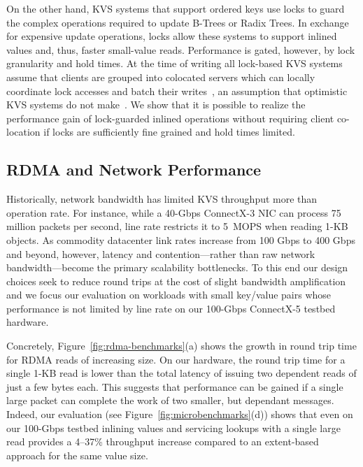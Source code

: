 On the other hand, KVS systems that support ordered keys use
locks to guard the complex operations required to update B-Trees or
Radix Trees.  In exchange for expensive update operations, locks allow
these systems to support inlined values and, thus, faster small-value
reads.  Performance is gated, however, by lock granularity and hold
times. At the time of writing all lock-based KVS systems assume that
clients are grouped into colocated servers which can locally
coordinate lock accesses and batch their writes~\cite{smart,sherman},
an assumption that optimistic
KVS systems do not make~\cite{ditto,fusee,clover,race}. We show that it is possible to
realize the performance gain of lock-guarded inlined operations
without requiring client co-location if locks are sufficiently fine
grained and hold times limited.

\subsection{RDMA and Network Performance}

Historically, network bandwidth has limited KVS throughput more than
operation rate. For instance, while a 40-Gbps ConnectX-3 NIC can
process 75 million packets per second, line rate restricts it to
5~MOPS when reading 1-KB objects. As commodity datacenter link rates
increase from 100 Gbps to 400 Gbps and beyond, however, latency and
contention---rather than raw network bandwidth---become the primary
scalability bottlenecks. To this end our design choices seek to reduce
round trips at the cost of slight bandwidth amplification
and we focus our evaluation on workloads with small key/value pairs
whose performance is not limited by line rate on our 100-Gbps ConnectX-5 testbed
hardware.

Concretely, Figure~\ref{fig:rdma-benchmarks}(a) shows the growth in
round trip time for RDMA reads of increasing size. On our hardware,
the round trip time for a single 1-KB read is lower than the total
latency of issuing two dependent reads of just a few bytes each.  This
suggests that performance can be gained if a single large packet can
complete the work of two smaller, but dependant messages.  
Indeed, our
evaluation (see Figure~\ref{fig:microbenchmarks}(d)) shows that even on our
100-Gbps testbed inlining values and servicing lookups with a single
large read provides a 4--37\% throughput increase compared to an
extent-based approach for the same value size.


